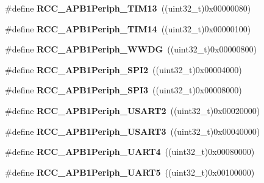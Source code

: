 \begin{DoxyCompactItemize}
\#define {\bfseries R\+C\+C\+\_\+\+A\+P\+B1\+Periph\+\_\+\+T\+I\+M13}~((uint32\+\_\+t)0x00000080)
\item 
\mbox{\label{group___r_c_c___a_p_b1___peripherals_ga7100c45768eea1484f6fd519b53e287d}} 
\#define {\bfseries R\+C\+C\+\_\+\+A\+P\+B1\+Periph\+\_\+\+T\+I\+M14}~((uint32\+\_\+t)0x00000100)
\item 
\mbox{\label{group___r_c_c___a_p_b1___peripherals_gad84e40be78ddc40b8eae1c2b0898f6b1}} 
\#define {\bfseries R\+C\+C\+\_\+\+A\+P\+B1\+Periph\+\_\+\+W\+W\+DG}~((uint32\+\_\+t)0x00000800)
\item 
\mbox{\label{group___r_c_c___a_p_b1___peripherals_gaa21f1dfb4fcf241c6f85a048eaca29df}} 
\#define {\bfseries R\+C\+C\+\_\+\+A\+P\+B1\+Periph\+\_\+\+S\+P\+I2}~((uint32\+\_\+t)0x00004000)
\item 
\mbox{\label{group___r_c_c___a_p_b1___peripherals_gabb0b40e839ef7403b086482e89d56f35}} 
\#define {\bfseries R\+C\+C\+\_\+\+A\+P\+B1\+Periph\+\_\+\+S\+P\+I3}~((uint32\+\_\+t)0x00008000)
\item 
\mbox{\label{group___r_c_c___a_p_b1___peripherals_gaa69c77220b943a42a4bacb8a3bf87dd0}} 
\#define {\bfseries R\+C\+C\+\_\+\+A\+P\+B1\+Periph\+\_\+\+U\+S\+A\+R\+T2}~((uint32\+\_\+t)0x00020000)
\item 
\mbox{\label{group___r_c_c___a_p_b1___peripherals_gaf72838a63d7d6200f251c1eb334cbaac}} 
\#define {\bfseries R\+C\+C\+\_\+\+A\+P\+B1\+Periph\+\_\+\+U\+S\+A\+R\+T3}~((uint32\+\_\+t)0x00040000)
\item 
\mbox{\label{group___r_c_c___a_p_b1___peripherals_ga839d7ae3386622158210ecf53d9cd989}} 
\#define {\bfseries R\+C\+C\+\_\+\+A\+P\+B1\+Periph\+\_\+\+U\+A\+R\+T4}~((uint32\+\_\+t)0x00080000)
\item 
\mbox{\label{group___r_c_c___a_p_b1___peripherals_gaa00c73f88a7af45fb29df97b07acd856}} 
\#define {\bfseries R\+C\+C\+\_\+\+A\+P\+B1\+Periph\+\_\+\+U\+A\+R\+T5}~((uint32\+\_\+t)0x00100000)

\end{DoxyCompactItemize}
